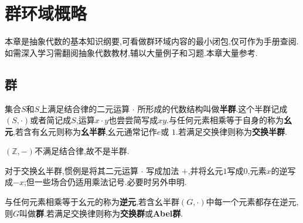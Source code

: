 \setcounter{chapter}{-1}
\chapter{群环域概略}
本章是抽象代数的基本知识纲要,可看做群环域内容的最小闭包,仅可作为手册查阅.如需深入学习需翻阅抽象代数教材,辅以大量例子和习题.本章大量参考\cite{FK}\cite{LW}.
\section{群}
\begin{definition}\label{def:monoid}
	集合$S$和$S$上满足结合律的二元运算 $\cdot$ 所形成的代数结构叫做\textbf{半群}.这个半群记成$(S,\cdot)$或者简记成$S$,运算$x\cdot y$也尝尝简写成$xy$.与任何元素相乘等于自身的称为\textbf{幺元},若含有幺元则称为\textbf{幺半群},幺元通常记作$e$或 $1$.若满足交换律则称为\textbf{交换半群}.
\end{definition}
\begin{example}
	$(\mathbb{Z},-)$不满足结合律,故不是半群.
\end{example}

对于交换幺半群,惯例是将其二元运算 $\cdot$ 写成加法 $+$,并将幺元$1$写成$0$,元素$x$的逆写成$-x$;但一些场合仍适用乘法记号.必要时另外申明.
\begin{definition}\label{def:group}
	与任何元素相乘等于幺元的称为\textbf{逆元},若含幺半群$(G,\cdot)$中每一个元素都存在逆元,则$G$叫做\textbf{群}.若满足交换律则称为\textbf{交换群}或\textbf{Abel群}.
\end{definition}

